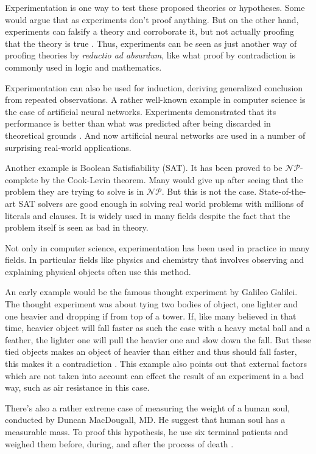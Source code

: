 Experimentation is one way to test these proposed theories or hypotheses.
Some would argue that as experiments don't proof anything.
But on the other hand, experiments can falsify a theory and corroborate it, but not actually proofing that the theory is true \citep{tichyShouldComputerScientists1998}.
Thus, experiments can be seen as just another way of proofing theories by \textit{reductio ad absurdum}, like what proof by contradiction is commonly used in logic and mathematics.

Experimentation can also be used for induction, deriving generalized conclusion from repeated observations.
A rather well-known example in computer science is the case of artificial neural networks.
Experiments demonstrated that its performance is better than what was predicted after being discarded in theoretical grounds \citep{tichyShouldComputerScientists1998}.
And now artificial neural networks are used in a number of surprising real-world applications.

Another example is Boolean Satisfiability (SAT).
It has been proved to be $\mathcal{NP}$-complete by the Cook-Levin theorem.
Many would give up after seeing that the problem they are trying to solve is in $\mathcal{NP}$.
But this is not the case.
State-of-the-art SAT solvers are good enough in solving real world problems with millions of literals and clauses.
It is widely used in many fields despite the fact that the problem itself is seen as bad in theory.

Not only in computer science, experimentation has been used in practice in many fields.
In particular fields like physics and chemistry that involves observing and explaining physical objects often use this method.

An early example would be the famous thought experiment by Galileo Galilei.
The thought experiment was about tying two bodies of object, one lighter and one heavier and dropping if from top of a tower.
If, like many believed in that time, heavier object will fall faster as such the case with a heavy metal ball and a feather, the lighter one will pull the heavier one and slow down the fall.
But these tied objects makes an object of heavier than either and thus should fall faster, this makes it a contradiction \citep{goodmanWhatDoesResearch2016}. This example also points out that external factors which are not taken into account can effect the result of an experiment in a bad way, such as air resistance in this case.

There's also a rather extreme case of measuring the weight of a human soul, conducted by Duncan MacDougall, MD. He suggest that human soul has a measurable mass. To proof this hypothesis, he use six terminal patients and weighed them before, during, and after the process of death \citep{ryanModernExperimentalDesign2007a}.

